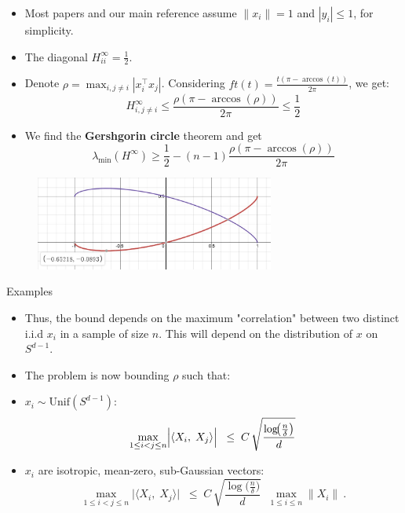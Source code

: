 \documentclass[serif, aspectratio=169]{beamer}
\begin{document}
\begin{frame}
	\begin{itemize}
		\item Most papers and our main reference assume \(\|x_i\|=1\) and \(|y_i|\leq 1\), for simplicity.
		\item The diagonal \(H^\infty_{ii} = \frac{1}{2}\).
		\item Denote \(\rho = \max_{i,j\neq i} |x_i^\top x_j| \). Considering \(ft(t)=\frac{t(\pi-\arccos(t))}{2\pi}\), we get:
		\[
		H^\infty_{i,j\neq i} \leq \frac{\rho(\pi-\arccos(\rho))}{2\pi} \leq \frac{1}{2}
		\]
		\item We find the \textbf{Gershgorin circle} theorem and get
		\[
		 \lambda_{\min}(H^\infty) \geq  \frac{1}{2} - (n-1)\frac{\rho(\pi-\arccos(\rho))}{2\pi}
		\]
	\end{itemize}
	\begin{figure}
		\includegraphics[width=0.7\textwidth]{pic/Arc-Cos-Func.jpg}
	\end{figure}
\end{frame}



\begin{frame}{Examples}
	\begin{itemize}
		
		\item Thus, the bound depends on the maximum "correlation" between two distinct i.i.d \(x_i\) in a sample of size \(n\). This will depend on the distribution of \(x\) on \(S^{d-1}\).
		\item The problem is now bounding \(\rho\) such that:
		
		\item \(x_i \sim \text{Unif}(S^{d-1})\):
		\[
		\max_{1 \le i < j \le n}
		\Bigl|\langle X_i,\;X_j\rangle\Bigr|
		\;\;\le\;
		C\,
		\sqrt{\frac{\log\!\bigl(\tfrac{n}{\delta}\bigr)}{d}}
		\,
		\]
		
		\item \(x_i\) are isotropic, mean-zero, sub-Gaussian vectors:
		\[
		\max_{1 \le i < j \le n}
		\bigl|\langle X_i,\;X_j\rangle\bigr|
		\;\;\le\;
		C\,
		\sqrt{\frac{\log\!\bigl(\tfrac{n}{\delta}\bigr)}{d}}
		\;\;\max_{1\le i\le n}\|X_i\|\ .
		\]
	\end{itemize}
\end{frame}
\end{document}
